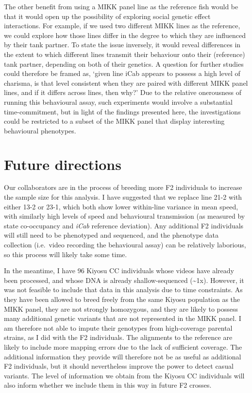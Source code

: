\documentclass[
]{book}
\begin{document}
The other benefit from using a MIKK panel line as the reference fish would be that it would open up the possibility of exploring social genetic effect interactions. For example, if we used two different MIKK lines as the reference, we could explore how those lines differ in the degree to which they are influenced by their tank partner. To state the issue inversely, it would reveal differences in the extent to which different lines transmit their behaviour onto their (reference) tank partner, depending on both of their genetics. A question for further studies could therefore be framed as, `given line \textcolor{iCab_424B4D}{iCab} appears to possess a high level of charisma, is that level consistent when they are paired with different MIKK panel lines, and if it differs across lines, then why?' Due to the relative onerousness of running this behavioural assay, such experiments would involve a substantial time-commitment, but in light of the findings presented here, the investigations could be restricted to a subset of the MIKK panel that display interesting behavioural phenotypes.

\hypertarget{future-directions}{%
\section{Future directions}\label{future-directions}}

Our collaborators are in the process of breeding more F2 individuals to increase the sample size for this analysis. I have suggested that we replace line 21-2 with either 13-2 or 23-1, which both show lower within-line variance in mean speed, with similarly high levels of speed and behavioural transmission (as measured by state co-occupancy and \emph{iCab} reference deviation). Any additional F2 individuals will still need to be phenotyped and sequenced, and the phenotype data collection (i.e.~video recording the behavioural assay) can be relatively laborious, so this process will likely take some time.

In the meantime, I have 96 Kiyosu CC individuals whose videos have already been processed, and whose DNA is already shallow-sequenced (\textasciitilde1x). However, it was not feasible to include that data in this analysis due to time constraints. As they have been allowed to breed freely from the same Kiyosu population as the MIKK panel, they are not strongly homozygous, and they are likely to possess many additional genetic variants that are not represented in the MIKK panel. I am therefore not able to impute their genotypes from high-coverage parental strains, as I did with the F2 individuals. The alignments to the reference are likely to include more mapping errors due to the lack of sufficient coverage. The additional information they provide will therefore not be as useful as additional F2 individuals, but it should nevertheless improve the power to detect casual variants. The level of information we obtain from the Kiyosu CC individuals will also inform whether we include them in this way in future F2 crosses.
\end{document}
